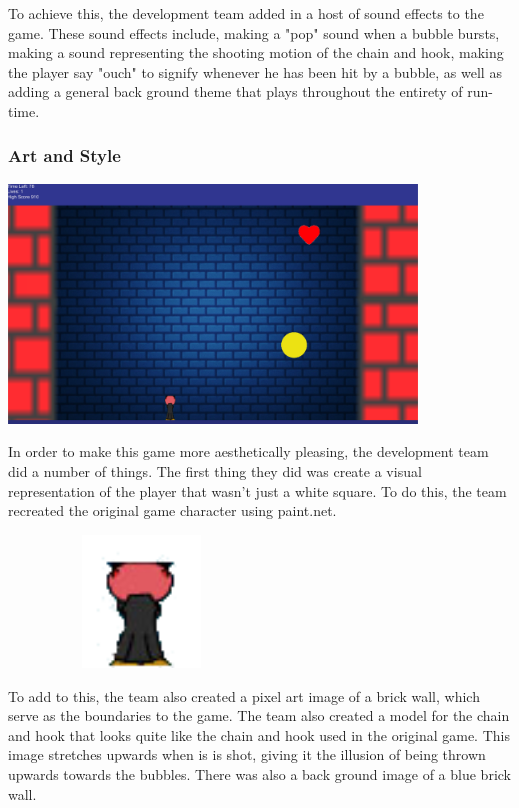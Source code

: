 \documentclass{article}
\begin{document}
To achieve this, the development team added in a host of sound effects to the game. These sound effects include, making a "pop" sound when a bubble bursts, making a sound representing the shooting motion of the chain and hook, making the player say "ouch" to signify whenever he has been hit by a bubble, as well as adding a general back ground theme that plays throughout the entirety of run-time. 



\subsubsection{Art and Style}

\bigskip

\includegraphics[width=\textwidth, height=180pt]{img/Art.PNG}

\bigskip

In order to make this game more aesthetically pleasing, the development team did a number of things. The first thing they did was create a visual representation of the player that wasn't just a white square. To do this, the team recreated the original game character using paint.net.

\bigskip

\includegraphics[width=200pt, height=100pt]{img/Player.png}

\bigskip

To add to this, the team also created a pixel art image of a brick wall, which serve as the boundaries to the game. The team also created a model for the chain and hook that looks quite like the chain and hook used in the original game. This image stretches upwards when is is shot, giving it the illusion of being thrown upwards towards the bubbles. There was also a back ground image of a blue brick wall.  
\end{document}
